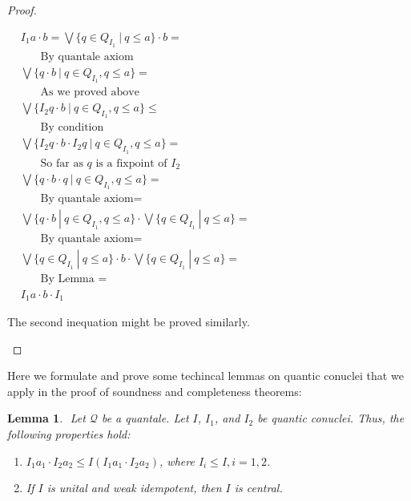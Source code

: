 \documentclass[a4paper]{article}
\theoremstyle{defin}
\theoremstyle{theorem}
\theoremstyle{prop}
\theoremstyle{lemma}
\newtheorem{lemma}{Lemma}
\theoremstyle{ex}
\theoremstyle{col}
\begin{document}
\begin{proof}
\begin{enumerate}
  $\begin{array}{lll}
  &I_1 a \cdot b = \bigvee \{ q \in Q_{I_1} \: | \: q \leq a \} \cdot b = & \\
  & \:\:\:\:\:\:\:\: \text{By quantale axiom}& \\
  & \bigvee \{ q \cdot b \: | \: q \in Q_{I_1}, q \leq a \} = & \\
  & \:\:\:\:\:\:\:\: \text{As we proved above}& \\
  & \bigvee \{ I_2 q \cdot b \: | \: q \in Q_{I_1}, q \leq a \} \leq & \\
  & \:\:\:\:\:\:\:\: \text{By condition}& \\
  & \bigvee \{ I_2 q \cdot b \cdot I_2 q \: | \: q \in Q_{I_1}, q \leq a \} = & \\
  & \:\:\:\:\:\:\:\: \text{So far as $q$ is a fixpoint of $I_2$} & \\
  & \bigvee \{ q \cdot b \cdot q \: | \: q \in Q_{I_1}, q \leq a \} = & \\
  & \:\:\:\:\:\:\:\: \text{By quantale axiom} = & \\
  & \bigvee \{ q \cdot b \: | \: q \in Q_{I_1}, q \leq a \} \cdot \bigvee \{ q \in Q_{I_1} \: | \: q \leq a \} = & \\
  & \:\:\:\:\:\:\:\: \text{By quantale axiom} = & \\
  & \bigvee \{ q \in Q_{I_1} \: | \: q \leq a \} \cdot b \cdot \bigvee \{ q \in Q_{I_1} \: | \: q \leq a \} = & \\
  & \:\:\:\:\:\:\:\: \text{By Lemma } = & \\
  &I_1 a \cdot b \cdot I_1&
  \end{array}$

  The second inequation might be proved similarly.
\end{enumerate}
\end{proof}

Here we formulate and prove some techincal lemmas on quantic conuclei that we apply in the proof of soundness and completeness theorems:

\begin{lemma}
  $ $
  Let $\mathcal{Q}$ be a quantale. Let $I$, $I_1$, and $I_2$ be quantic conuclei. Thus, the following properties hold:
  \begin{enumerate}
  \item $I_1 a_1 \cdot I_2 a_2 \leq I (I_1 a_1 \cdot I_2 a_2)$, where $I_i \leq I, i = 1,2$.
  \item If $I$ is unital and weak idempotent, then $I$ is central.
  \end{enumerate}
\end{lemma}
\end{document}
